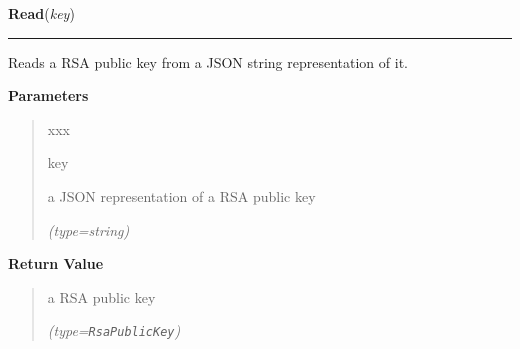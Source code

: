     \label{keyczar:keys:RsaPublicKey:Read}

    \vspace{0.5ex}

\hspace{.8\funcindent}\begin{boxedminipage}{\funcwidth}

    \raggedright \textbf{Read}(\textit{key})

    \vspace{-1.5ex}

    \rule{\textwidth}{0.5\fboxrule}
\setlength{\parskip}{2ex}
    Reads a RSA public key from a JSON string representation of it.

\setlength{\parskip}{1ex}
      \textbf{Parameters}
      \vspace{-1ex}

      \begin{quote}
        \begin{Ventry}{xxx}

          \item[key]

          a JSON representation of a RSA public key

            {\it (type=string)}

        \end{Ventry}

      \end{quote}

      \textbf{Return Value}
    \vspace{-1ex}

      \begin{quote}
      a RSA public key

      {\it (type=\texttt{RsaPublicKey})}

      \end{quote}

    \end{boxedminipage}

    \label{keyczar:keys:RsaPublicKey:Encrypt}

    \vspace{0.5ex}

